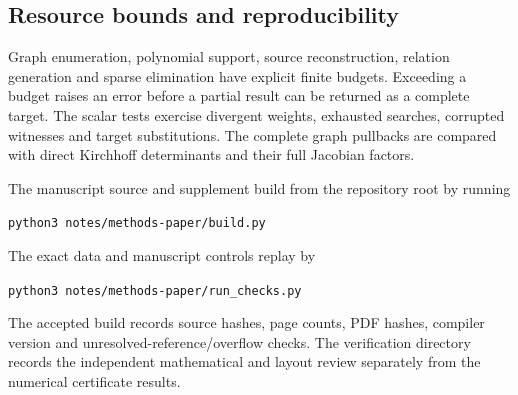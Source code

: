 \subsection{Resource bounds and reproducibility}

Graph enumeration, polynomial support, source reconstruction,
relation generation and sparse elimination have explicit finite
budgets. Exceeding a budget raises an error before a partial
result can be returned as a complete target. The scalar tests
exercise divergent weights, exhausted searches, corrupted
witnesses and target substitutions. The complete graph pullbacks
are compared with direct Kirchhoff determinants and their full
Jacobian factors.

The manuscript source and supplement build from the repository
root by running
\begin{center}
\texttt{python3 notes/methods-paper/build.py}
\end{center}
The exact data and manuscript controls replay by
\begin{center}
\texttt{python3 notes/methods-paper/run\_checks.py}
\end{center}
The accepted build records source hashes, page counts, PDF hashes,
compiler version and unresolved-reference/overflow checks. The
verification directory records the independent mathematical and
layout review separately from the numerical certificate results.
